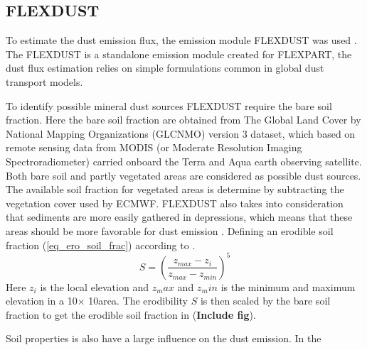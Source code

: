 \subsection{FLEXDUST}
To estimate the dust emission flux, the emission module FLEXDUST was used   
\parencite{flexdust_ref_2016}. The FLEXDUST is a standalone emission module
created for FLEXPART, the dust flux estimation relies on simple formulations
common in global dust transport models. 

To identify possible mineral dust sources FLEXDUST require the bare soil
fraction. Here the bare soil fraction are obtained from The Global Land Cover by National Mapping
Organizations (GLCNMO) version 3 \parencite{shirahata2017production} dataset, which
based on remote sensing data from MODIS (or Moderate Resolution Imaging
Spectroradiometer) carried onboard the Terra and Aqua earth observing satellite.
Both bare soil and partly vegetated areas are considered as possible dust
sources. The available soil fraction for vegetated areas is determine by
subtracting the vegetation cover used by ECMWF. FLEXDUST also takes into
consideration that sediments are more easily gathered in depressions, which
means that these areas should be more favorable for dust emission
\parencite{zender2003mineral}. Defining an erodible soil fraction (\cref{eq_ero_soil_frac}) according to \textcite{dust_dist_Ginoux2001}.
\begin{equation}\label{eq_ero_soil_frac}
    S = \left(\frac{z_{max} - z_i}{z_{max} - z_{min}}\right)^5 
\end{equation}    
Here $z_i$ is the local elevation and $z_max$ and $z_min$ is the minimum and
maximum elevation in a 10\degree $\times$ 10\degree area. The erodibility $S$ is
then scaled by the bare soil fraction to get the erodible soil fraction in (\textbf{Include fig}). 

Soil properties is also have a large influence on the dust emission. In the  
